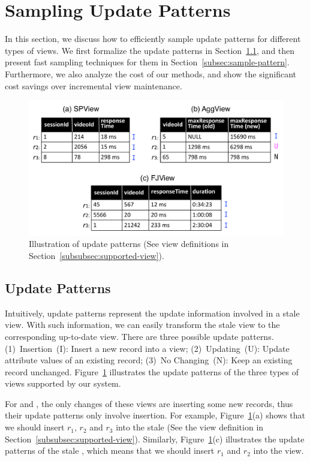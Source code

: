 \section{Sampling Update Patterns}
In this section, we discuss how to efficiently sample update patterns for different types of views.
We first formalize the update patterns in Section~\ref{subsec:pattern}, and then present fast sampling techniques for them in Section~\ref{subsec:sample-pattern}. Furthermore, we also analyze the cost of our methods, and show the significant cost savings over incremental view maintenance.

\begin{figure}[t]
\centering
 \includegraphics[scale=0.45]{figs/update-pattern.pdf}\vspace{-1em}
 \caption{Illustration of update patterns (See view definitions in Section~\ref{subsubsec:supported-view}). }\label{fig:update-pattern}
\end{figure}


\subsection{Update Patterns}\label{subsec:pattern}
Intuitively, update patterns represent the update information involved in a stale view. With such information, we can easily transform the stale view to the corresponding up-to-date view. There are three possible update patterns. (1)~Insertion~(I): Insert a new record into a view;
(2)~Updating~(U): Update attribute values of an existing record; (3)~No Changing~(N): Keep an existing record unchanged. Figure~\ref{fig:update-pattern} illustrates the update patterns of the three types of views supported by our system.

For \spview and \fjview, the only changes of these views are inserting some new records, thus their update patterns only involve insertion.  
For example, Figure~\ref{fig:update-pattern}(a) shows that we should insert $r_1$, $r_2$ and $r_3$ into the stale \spview (See the view definition in Section~\ref{subsubsec:supported-view}). Similarly, Figure~\ref{fig:update-pattern}(c) illustrates the update patterns of the stale \fjview, which means that we should insert $r_1$ and $r_2$ into the view.

